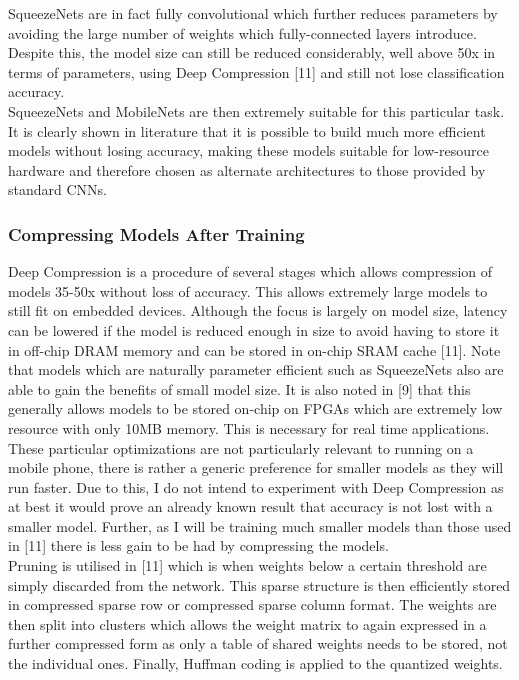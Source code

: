 \documentclass{article}
\begin{document}
SqueezeNets are in fact fully convolutional which further reduces parameters by avoiding the large number of weights which fully-connected layers introduce. Despite this, the model size can still be reduced considerably, well above 50x in terms of parameters, using Deep Compression  [11] and still not lose classification accuracy.\\

SqueezeNets and MobileNets are then extremely suitable for this particular task. It is clearly shown in  literature that it is possible to build much more efficient models without losing accuracy, making these models suitable for low-resource hardware and therefore chosen as alternate architectures to those provided by standard CNNs. \\
\subsubsection{Compressing Models After Training}

Deep Compression is a procedure of several stages which allows compression of models 35-50x without loss of accuracy. This allows extremely large models to still fit on embedded devices. Although the focus is largely on model size, latency can be lowered if the model is reduced enough in size to avoid having to store it in off-chip DRAM memory and can be stored in on-chip SRAM cache [11]. Note that models which are naturally parameter efficient such as SqueezeNets also are able to gain the benefits of small model size. It is also noted in [9] that this generally allows models to be stored on-chip on FPGAs which are extremely low resource with only 10MB memory. This is necessary for real time applications.\\

These particular optimizations are not particularly relevant to running on a mobile phone, there is rather a generic preference for smaller models as they will run faster. Due to this, I do not intend to experiment with Deep Compression as at best it would prove an already known result that accuracy is not lost with a smaller model. Further, as I will be training much smaller models than those used in [11] there is less gain to be had by compressing the models. \\

Pruning is utilised in [11] which is when weights below a certain threshold are simply discarded from the network. This sparse structure is then efficiently stored in compressed sparse row or compressed sparse column format. The weights are then split into clusters which allows the weight matrix to again expressed in a further compressed form as only a table of shared weights needs to be stored, not the individual ones. Finally, Huffman coding is applied to the quantized weights.\\
\end{document}
